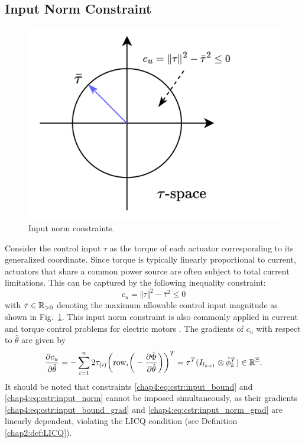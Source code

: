 \subsection{Input Norm Constraint} \label{chap4:sec:input_norm_cstr}

\begin{figure}[t]
    \centering
    \includegraphics[width=0.5\linewidth]{imgs/cstr_input_norm.drawio.png}
    \caption{Input norm constraints.}
    \label{chap4:fig:cstr:u_norm}
\end{figure}

Consider the control input $\tau$ as the torque of each actuator corresponding to its generalized coordinate. 
Since torque is typically linearly proportional to current, actuators that share a common power source are often subject to total current limitations. 
This can be captured by the following inequality constraint: 
\begin{equation}
    c_{u}=\Vert\tau\Vert^2 -\bar\tau^2  \le 0
    \label{chap4:eq:cstr:input_norm}
\end{equation}
with $\bar\tau\in\mathbb{R}_{>0}$ denoting the maximum allowable control input magnitude as shown in Fig.~\ref{chap4:fig:cstr:u_norm}. 
This input norm constraint is also commonly applied in current and torque control problems for electric motors \cite{RN90}.
The gradients of $c_{u}$ with respect to $\hat\theta$ are given by
\begin{equation}
    {\partial \mathbf \mathbf c_{u} \over \partial \hat\theta}
    = -\sum_{i=1}^n 2\tau_{(i)} 
    \bigg(
        \text{row}_i
        \bigg(
            -{\partial \hat\Phi\over\partial\hat\theta}
        \bigg)
    \bigg)^T  
    = \tau^T (I_{l_{k+1}}\otimes \hat\phi_k^T)
    \in \mathbb{R}^{\Xi}.
    \label{chap4:eq:cstr:input_norm_grad}
\end{equation}
It should be noted that constraints \eqref{chap4:eq:cstr:input_bound} and \eqref{chap4:eq:cstr:input_norm} cannot be imposed simultaneously, as their gradients \eqref{chap4:eq:cstr:input_bound_grad} and \eqref{chap4:eq:cstr:input_norm_grad} are linearly dependent, violating the LICQ condition (see Definition \ref{chap2:def:LICQ}).

